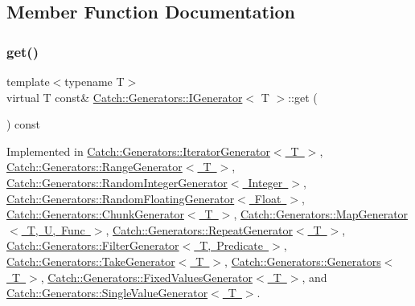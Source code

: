 \subsection{Member Function Documentation}
\mbox{\label{struct_catch_1_1_generators_1_1_i_generator_a525d381fc9249a885b075a0632a8579a}} 
\subsubsection{\texorpdfstring{get()}{get()}}
{\footnotesize\ttfamily template$<$typename T$>$ \\
virtual T const\& \mbox{\hyperlink{struct_catch_1_1_generators_1_1_i_generator}{Catch\+::\+Generators\+::\+I\+Generator}}$<$ T $>$\+::get (\begin{DoxyParamCaption}{ }\end{DoxyParamCaption}) const\hspace{0.3cm}{\ttfamily [pure virtual]}}



Implemented in \mbox{\hyperlink{class_catch_1_1_generators_1_1_iterator_generator_a61688118e5caba23340b4b949c3bb7e4}{Catch\+::\+Generators\+::\+Iterator\+Generator$<$ T $>$}}, \mbox{\hyperlink{class_catch_1_1_generators_1_1_range_generator_a2639173bb9f06ba353314cd226fcefec}{Catch\+::\+Generators\+::\+Range\+Generator$<$ T $>$}}, \mbox{\hyperlink{class_catch_1_1_generators_1_1_random_integer_generator_aafbdf9028762f5e8f8ca9c317d686fca}{Catch\+::\+Generators\+::\+Random\+Integer\+Generator$<$ Integer $>$}}, \mbox{\hyperlink{class_catch_1_1_generators_1_1_random_floating_generator_a0dea6fa1f9e2647df022f0b588cf0a8f}{Catch\+::\+Generators\+::\+Random\+Floating\+Generator$<$ Float $>$}}, \mbox{\hyperlink{class_catch_1_1_generators_1_1_chunk_generator_aa41c7d08a165b6a18560f2ab9e977f0b}{Catch\+::\+Generators\+::\+Chunk\+Generator$<$ T $>$}}, \mbox{\hyperlink{class_catch_1_1_generators_1_1_map_generator_a199d377afba00519f202c59b4b488235}{Catch\+::\+Generators\+::\+Map\+Generator$<$ T, U, Func $>$}}, \mbox{\hyperlink{class_catch_1_1_generators_1_1_repeat_generator_a43bd573274c9a0cd7f4406a3d0d36d49}{Catch\+::\+Generators\+::\+Repeat\+Generator$<$ T $>$}}, \mbox{\hyperlink{class_catch_1_1_generators_1_1_filter_generator_ab30e81b61a77430661d40f814758f6fe}{Catch\+::\+Generators\+::\+Filter\+Generator$<$ T, Predicate $>$}}, \mbox{\hyperlink{class_catch_1_1_generators_1_1_take_generator_aa4d2560f2066ec2eb4a351d62c107c78}{Catch\+::\+Generators\+::\+Take\+Generator$<$ T $>$}}, \mbox{\hyperlink{class_catch_1_1_generators_1_1_generators_a66705482b7efa88cae6e6b7062d5de6a}{Catch\+::\+Generators\+::\+Generators$<$ T $>$}}, \mbox{\hyperlink{class_catch_1_1_generators_1_1_fixed_values_generator_ad2ea8c959c600386bcc4b2656b40d33e}{Catch\+::\+Generators\+::\+Fixed\+Values\+Generator$<$ T $>$}}, and \mbox{\hyperlink{class_catch_1_1_generators_1_1_single_value_generator_a5142058c52131a2471e7307972f99b50}{Catch\+::\+Generators\+::\+Single\+Value\+Generator$<$ T $>$}}.



